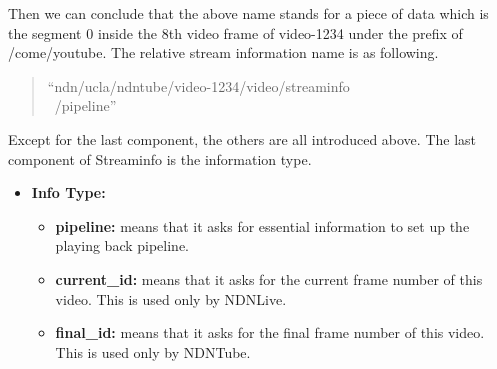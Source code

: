 Then we can conclude that the above name stands for a piece of data which is the segment 0 inside the 8th video frame of video-1234 under the prefix of /come/youtube. The relative stream information name is as following.
\begin{quote}
``ndn/ucla/ndntube/video-1234/video/streaminfo \\\ /pipeline''
\end{quote}

Except for the last component, the others are all introduced above. The last component of Streaminfo is the information type.
\begin{itemize}
	\item{\textbf{Info Type:}} 
	\begin{itemize}
		\item{\textbf{pipeline:}} means that it asks for essential information to set up the playing back pipeline. 
		\item{\textbf{current\_id:}} means that it asks for the current frame number of this video. This is used only by NDNLive.
		\item{\textbf{final\_id:}} means that it asks for the final frame number of this video. This is used only by NDNTube. 
	\end{itemize}
\end{itemize}



